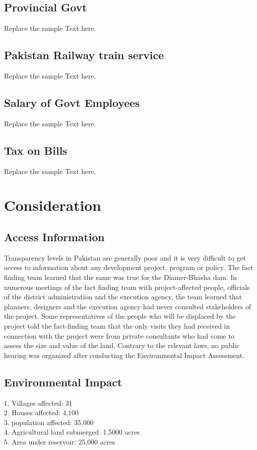 \documentclass[11pt, journal,letterpaper,compsoc]{IEEEtran}
\begin{document}
\subsection{Provincial Govt}
Replace the sample Text here.

\subsection{Pakistan Railway train service}
Replace the sample Text here.

\subsection{Salary of Govt Employees}
Replace the sample Text here.

\subsection{Tax on Bills}
Replace the sample Text here.
	

\section{Consideration}

\subsection{Access Information}
Transparency levels in Pakistan are generally poor and it is very difficult to get access to information about any development project, program or policy. The fact finding team learned that the same was true for the Diamer-Bhasha dam. In numerous meetings of the fact finding team with project-affected people, officials of the district administration and the execution agency, the team learned that planners, designers and the execution agency had never consulted stakeholders of the project. Some representatives of the people who will be displaced by the project told the fact-finding team that the only visits they had received in connection with the project were from private consultants who had come to assess the size and value of the land. Contrary to the relevant laws, no public hearing was organized after conducting the Environmental Impact Assessment. 

\subsection{Environmental Impact}
1. Villages affected: 31 \\
2. Houses affected: 4,100 \\
3. population affected: 35,000 \\
4. Agricultural land submerged: 1,5000 acres \\
5. Area under reservoir: 25,000 acres 
\end{document}
